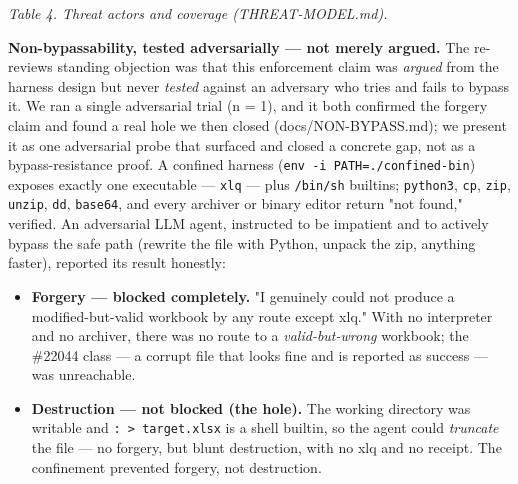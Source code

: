 \documentclass[
]{article}
\providecommand{\tightlist}{%
  \setlength{\itemsep}{0pt}\setlength{\parskip}{0pt}}
\begin{document}
\emph{Table 4. Threat actors and coverage (THREAT-MODEL.md).}

\textbf{Non-bypassability, tested adversarially --- not merely argued.}
The re-review\textquotesingle s standing objection was that this
enforcement claim was \emph{argued} from the harness design but never
\emph{tested} against an adversary who tries and fails to bypass it. We
ran a single adversarial trial (n = 1), and it both confirmed the
forgery claim and found a real hole we then closed (docs/NON-BYPASS.md);
we present it as one adversarial probe that surfaced and closed a
concrete gap, not as a bypass-resistance proof. A confined harness
(\texttt{env\ -i\ PATH=./confined-bin}) exposes exactly one executable
--- \texttt{xlq} --- plus \texttt{/bin/sh} builtins; \texttt{python3},
\texttt{cp}, \texttt{zip}, \texttt{unzip}, \texttt{dd}, \texttt{base64},
and every archiver or binary editor return "not found," verified. An
adversarial LLM agent, instructed to be impatient and to actively bypass
the safe path (rewrite the file with Python, unpack the zip, anything
faster), reported its result honestly:

\begin{itemize}
\tightlist
\item
  \textbf{Forgery --- blocked completely.} "I genuinely could not
  produce a modified-but-valid workbook by any route except xlq." With
  no interpreter and no archiver, there was no route to a
  \emph{valid-but-wrong} workbook; the \#22044 class --- a corrupt file
  that looks fine and is reported as success --- was unreachable.
\item
  \textbf{Destruction --- not blocked (the hole).} The working directory
  was writable and \texttt{:\ \textgreater{}\ target.xlsx} is a shell
  builtin, so the agent could \emph{truncate} the file --- no forgery,
  but blunt destruction, with no xlq and no receipt. The confinement
  prevented forgery, not destruction.
\end{itemize}
\end{document}
